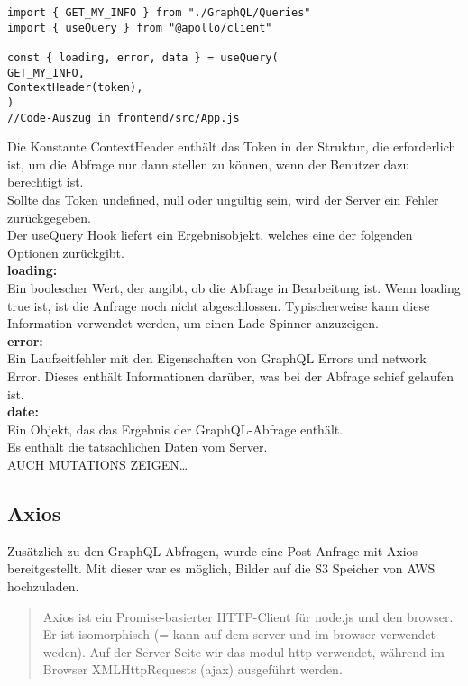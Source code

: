 \begin{lstlisting}
import { GET_MY_INFO } from "./GraphQL/Queries"
import { useQuery } from "@apollo/client"

const { loading, error, data } = useQuery(
GET_MY_INFO,
ContextHeader(token),
)
//Code-Auszug in frontend/src/App.js

\end{lstlisting}
Die Konstante ContextHeader enthält das Token in der Struktur, die erforderlich ist, um die Abfrage nur dann stellen zu können, wenn der Benutzer dazu berechtigt ist.
\\
Sollte das Token undefined, null oder ungültig sein, wird der Server ein Fehler zurückgegeben.
\\ 
Der useQuery Hook liefert ein Ergebnisobjekt, welches eine der folgenden Optionen zurückgibt.
\\
\textbf{loading:}\\
Ein boolescher Wert, der angibt, ob die Abfrage in Bearbeitung ist.
Wenn loading true ist, ist die Anfrage noch nicht abgeschlossen. Typischerweise kann diese Information verwendet werden, um einen Lade-Spinner anzuzeigen.
\\
\textbf{error:}\\
Ein Laufzeitfehler mit den Eigenschaften von GraphQL Errors und network Error.
Dieses enthält Informationen darüber, was bei der Abfrage schief gelaufen ist.
\\
\textbf{date:}\\
Ein Objekt, das das Ergebnis der GraphQL-Abfrage enthält.
\\Es enthält die tatsächlichen Daten vom Server.
\\

AUCH MUTATIONS ZEIGEN\dots
\newpage
\subsection{Axios}
Zusätzlich zu den GraphQL-Abfragen, wurde eine Post-Anfrage mit Axios bereitgestellt.
Mit dieser war es möglich, Bilder auf die S3 Speicher von AWS hochzuladen.

\begin{quote}
Axios ist ein Promise-basierter HTTP-Client für node.js und den browser. Er ist isomorphisch (= kann auf dem server und im browser verwendet weden). Auf der Server-Seite wir das modul http verwendet, während im Browser XMLHttpRequests (ajax) ausgeführt werden.
\end{quote}

